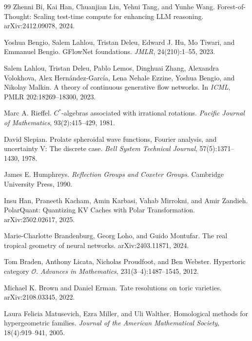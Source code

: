\documentclass[10pt]{article}
\theoremstyle{definition}
\theoremstyle{plain}
\theoremstyle{remark}
\begin{document}
\begin{thebibliography}{99}
Zhenni Bi, Kai Han, Chuanjian Liu, Yehui Tang, and Yunhe Wang.
\newblock Forest-of-Thought: Scaling test-time compute for enhancing LLM reasoning.
\newblock arXiv:2412.09078, 2024.

Yoshua Bengio, Salem Lahlou, Tristan Deleu, Edward J. Hu, Mo Tiwari, and Emmanuel Bengio.
\newblock GFlowNet foundations.
\newblock \emph{JMLR}, 24(210):1--55, 2023.

Salem Lahlou, Tristan Deleu, Pablo Lemos, Dinghuai Zhang, Alexandra Volokhova, Alex Hern\'andez-Garc\'ia, Lena Nehale Ezzine, Yoshua Bengio, and Nikolay Malkin.
\newblock A theory of continuous generative flow networks.
\newblock In \emph{ICML}, PMLR 202:18269--18300, 2023.

Marc A. Rieffel.
\newblock $C^*$-algebras associated with irrational rotations.
\newblock \emph{Pacific Journal of Mathematics}, 93(2):415--429, 1981.

David Slepian.
\newblock Prolate spheroidal wave functions, Fourier analysis, and uncertainty V: The discrete case.
\newblock \emph{Bell System Technical Journal}, 57(5):1371--1430, 1978.

James E. Humphreys.
\newblock \emph{Reflection Groups and Coxeter Groups}.
\newblock Cambridge University Press, 1990.

Insu Han, Praneeth Kacham, Amin Karbasi, Vahab Mirrokni, and Amir Zandieh.
\newblock PolarQuant: Quantizing KV Caches with Polar Transformation.
\newblock arXiv:2502.02617, 2025.

Marie-Charlotte Brandenburg, Georg Loho, and Guido Montufar.
\newblock The real tropical geometry of neural networks.
\newblock arXiv:2403.11871, 2024.

Tom Braden, Anthony Licata, Nicholas Proudfoot, and Ben Webster.
\newblock Hypertoric category $\mathcal O$.
\newblock \emph{Advances in Mathematics}, 231(3--4):1487--1545, 2012.

Michael K. Brown and Daniel Erman.
\newblock Tate resolutions on toric varieties.
\newblock arXiv:2108.03345, 2022.

Laura Felicia Matusevich, Ezra Miller, and Uli Walther.
\newblock Homological methods for hypergeometric families.
\newblock \emph{Journal of the American Mathematical Society}, 18(4):919--941, 2005.


\end{thebibliography}
\end{document}
